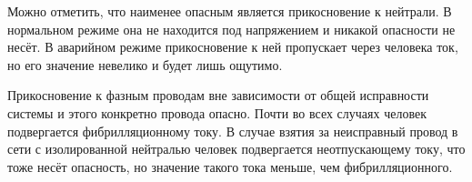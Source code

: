 	Можно отметить, что наименее опасным является прикосновение к нейтрали. В нормальном режиме она не находится под напряжением и никакой опасности не несёт. В аварийном режиме прикосновение к ней пропускает через человека ток, но его значение невелико и будет лишь ощутимо.
	
	Прикосновение к фазным проводам вне зависимости от общей исправности системы и этого конкретно провода опасно. Почти во всех случаях человек подвергается фибрилляционному току. В случае взятия за неисправный провод в сети с изолированной нейтралью человек подвергается неотпускающему току, что тоже несёт опасность, но значение такого тока меньше, чем фибрилляционного.


